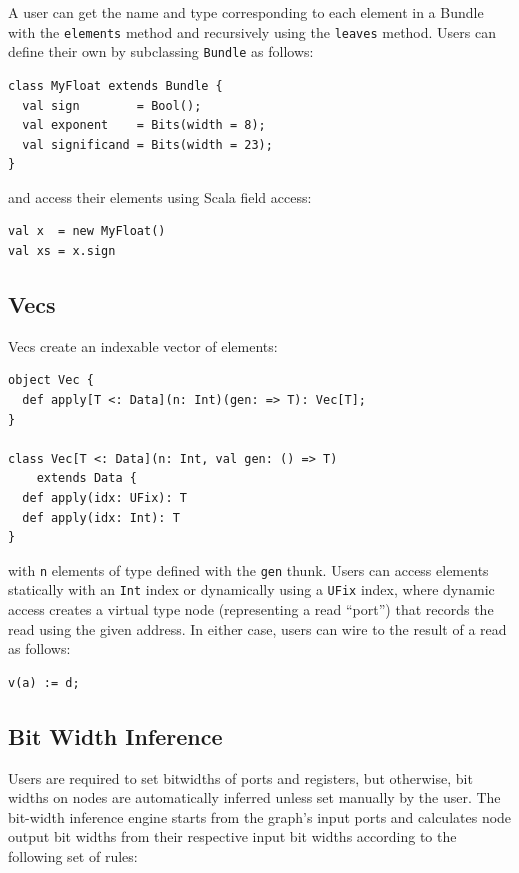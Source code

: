 \documentclass[10pt,twocolumn]{article}
\def\code#1{{\small\tt #1}}
\begin{document}
\noindent
A user can get the name and type corresponding to each element in a
Bundle with the \code{elements} method and recursively using the
\code{leaves} method. 
Users can define their own by subclassing \code{Bundle} as follows:

\begin{lstlisting}
class MyFloat extends Bundle {
  val sign        = Bool();
  val exponent    = Bits(width = 8);
  val significand = Bits(width = 23);
}
\end{lstlisting}

\noindent
and access their elements using Scala field access:

\begin{lstlisting}
val x  = new MyFloat()
val xs = x.sign
\end{lstlisting}

\subsection{Vecs}

Vecs create an indexable vector of elements: 

\begin{lstlisting}
object Vec {
  def apply[T <: Data](n: Int)(gen: => T): Vec[T];
}

class Vec[T <: Data](n: Int, val gen: () => T) 
    extends Data {
  def apply(idx: UFix): T
  def apply(idx: Int): T
}
\end{lstlisting}

\noindent
with \code{n} elements of type defined with the \code{gen} thunk.
Users can access elements statically with an \code{Int} index or
dynamically using a \code{UFix} index, 
where dynamic access creates a virtual type node (representing a read
``port'') that records the read using the given address.  In either case,
users can wire to the result of a read as follows:

\begin{lstlisting}
v(a) := d;
\end{lstlisting}


\subsection{Bit Width Inference}

Users are required to set bitwidths of ports and registers, but otherwise,
bit widths on nodes are automatically inferred unless set manually by the user.
The bit-width inference engine starts from the graph's input ports and 
calculates node output bit widths from their respective input bit widths according to the following set of rules:\\
\end{document}
